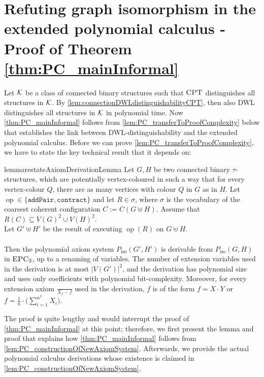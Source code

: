 \documentclass[10pt,a4paper]{article}
\newcommand{\CPT}{\mbox{\sc CPT}}
\newcommand{\EPC}{\mbox{\sc EPC}}
\newcommand{\Kk}{{\cal K}}
\newcommand{\pairOp }{\texttt{addPair}}
\newcommand{\sccOp }{\texttt{contract}}
\newcommand{\op}{\operatorname{op}}
\newcommand{\Piso}{P_{\text{iso}}}
\begin{document}
	\section{Refuting graph isomorphism in  the extended polynomial calculus - Proof of Theorem \ref{thm:PC_mainInformal}}	
	
	\label{sec:PC_mainProof}	
	Let $\Kk$ be a class of connected binary structures such that $\CPT$ distinguishes all structures in $\Kk$.
	By \autoref{lem:connectionDWLdistinguishabilityCPT}, then also DWL distinguishes all structures in $\Kk$ in polynomial time. 
	Now \autoref{thm:PC_mainInformal} follows from \autoref{lem:PC_transferToProofComplexity} below that establishes the link between DWL-distinguishability and the extended polynomial calculus. 
	Before we can prove \autoref{lem:PC_transferToProofComplexity}, we have to state the key technical result that it depends on: 
	\begin{restatable}{lemma}{restateAxiomDerivationLemma}
		\label{lem:PC_constructionOfNewAxiomSystem}
		Let $G,H$ be two connected binary $\tau$-structures, which are potentially vertex-coloured in such a way that for every vertex-colour $Q$, there are as many vertices with colour $Q$ in $G$ as in $H$.
		Let $\op \in \{ \pairOp , \sccOp \}$ and let $R \in \sigma$, where $\sigma$ is the vocabulary of the coarsest coherent configuration $C:= C(G \uplus H)$. Assume that $R(C) \subseteq V(G)^2 \cup V(H)^2$.\\
		Let $G' \uplus H'$ be the result of executing $\op(R)$ on $G \uplus H$.\\
		\\
		Then the polynomial axiom system $\Piso(G',H')$ is derivable from $\Piso(G,H)$ in $\EPC_3$, up to a renaming of variables. The number of extension variables used in the derivation is at most $|V(G')|^2$, and the derivation has polynomial size and uses only coefficients with polynomial bit-complexity. Moreover, for every extension axiom $\frac{}{X_f -f}$ used in the derivation, $f$ is of the form $f = X \cdot Y$ or $f = \frac{1}{n} \cdot \Big(\sum_{i=1}^{n^2} X_i\Big)$.
	\end{restatable}
	
	The proof is quite lengthy and would interrupt the proof of \autoref{thm:PC_mainInformal} at this point; therefore, we first present the lemma and proof that explains how \autoref{thm:PC_mainInformal} follows from \autoref{lem:PC_constructionOfNewAxiomSystem}. Afterwards, we provide the actual polynomial calculus derivations whose existence is claimed in \autoref{lem:PC_constructionOfNewAxiomSystem}. 
	
\end{document}
